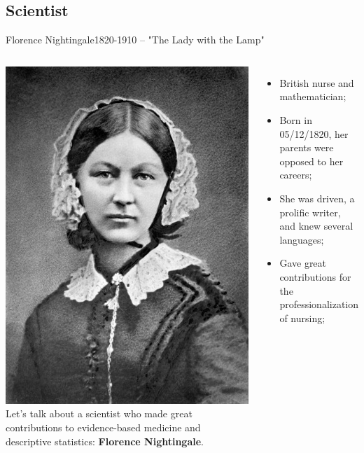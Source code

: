 \subsection{Scientist}
\begin{frame}{Florence Nightingale}{1820-1910 -- "The Lady with the Lamp"}
  \begin{columns}
      \includegraphics[width=\textwidth]{../img/florence}
      Let's talk about a scientist who made great contributions to evidence-based medicine and descriptive statistics: {\bf Florence Nightingale}.\bigskip

      \begin{itemize}
        \item British nurse and mathematician;\medskip

        \item Born in 05/12/1820, her parents were opposed to her careers;
        \item She was driven, a prolific writer, and knew several languages;
        \medskip

        \item Gave great contributions for the professionalization of nursing;
      \end{itemize}
  \end{columns}
\end{frame}

